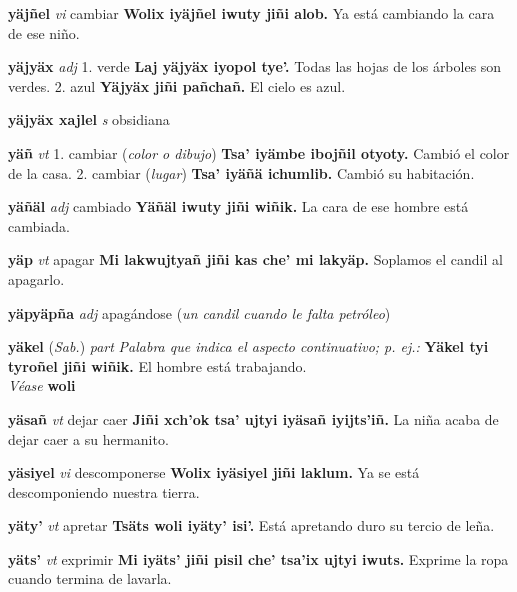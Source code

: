 \documentclass[10pt]{scrbook}
\newcommand{\entry}[1]{\textbf{#1}}
\newcommand{\onedefinition}[1]{#1.}
\newcommand{\nontranslationdef}[1]{\textit{#1}}
\newcommand{\partofspeech}[1]{\textit{#1}}
\newcommand{\spanishtranslation}[1]{#1}
\newcommand{\clarification}[1]{(\textit{#1})}
\newcommand{\cholexample}[1]{\textbf{#1}}
\newcommand{\exampletranslation}[1]{#1}
\newcommand{\alsosee}[1]{\\\textit{Véase} \textbf{#1}}
\newcommand{\relevantdialect}[1]{(\textit{#1})}
\begin{document}
\begin{multicols}{2}
\entry{yäjñel}
\partofspeech{vi}
\spanishtranslation{cambiar}
\cholexample{Wolix iyäjñel iwuty jiñi alob.}
\exampletranslation{Ya está cambiando la cara de ese niño.}

\entry{yäjyäx}
\partofspeech{adj}
\onedefinition{1}
\spanishtranslation{verde}
\cholexample{Laj yäjyäx iyopol tye'.}
\exampletranslation{Todas las hojas de los árboles son verdes.}
\onedefinition{2}
\spanishtranslation{azul}
\cholexample{Yäjyäx jiñi pañchañ.}
\exampletranslation{El cielo es azul.}

\entry{yäjyäx xajlel}
\partofspeech{s}
\spanishtranslation{obsidiana}

\entry{yäñ}
\partofspeech{vt}
\onedefinition{1}
\spanishtranslation{cambiar}
\clarification{color o dibujo}
\cholexample{Tsa' iyämbe ibojñil otyoty.}
\exampletranslation{Cambió el color de la casa.}
\onedefinition{2}
\spanishtranslation{cambiar}
\clarification{lugar}
\cholexample{Tsa' iyäñä ichumlib.}
\exampletranslation{Cambió su habitación.}

\entry{yäñäl}
\partofspeech{adj}
\spanishtranslation{cambiado}
\cholexample{Yäñäl iwuty jiñi wiñik.}
\exampletranslation{La cara de ese hombre está cambiada.}

\entry{yäp}
\partofspeech{vt}
\spanishtranslation{apagar}
\cholexample{Mi lakwujtyañ jiñi kas che' mi lakyäp.}
\exampletranslation{Soplamos el candil al apagarlo.}

\entry{yäpyäpña}
\partofspeech{adj}
\spanishtranslation{apagándose}
\clarification{un candil cuando le falta petróleo}

\entry{yäkel}
\relevantdialect{Sab.}
\partofspeech{part}
\nontranslationdef{Palabra que indica el aspecto continuativo; p. ej.:}
\cholexample{Yäkel tyi tyroñel jiñi wiñik.}
\exampletranslation{El hombre está trabajando.}
\alsosee{woli}

\entry{yäsañ}
\partofspeech{vt}
\spanishtranslation{dejar caer}
\cholexample{Jiñi xch'ok tsa' ujtyi iyäsañ iyijts'iñ.}
\exampletranslation{La niña acaba de dejar caer a su hermanito.}

\entry{yäsiyel}
\partofspeech{vi}
\spanishtranslation{descomponerse}
\cholexample{Wolix iyäsiyel jiñi laklum.}
\exampletranslation{Ya se está descomponiendo nuestra tierra.}

\entry{yäty'}
\partofspeech{vt}
\spanishtranslation{apretar}
\cholexample{Tsäts woli iyäty' isi'.}
\exampletranslation{Está apretando duro su tercio de leña.}

\entry{yäts'}
\partofspeech{vt}
\spanishtranslation{exprimir}
\cholexample{Mi iyäts' jiñi pisil che' tsa'ix ujtyi iwuts.}
\exampletranslation{Exprime la ropa cuando termina de lavarla.}


\end{multicols}
\end{document}
